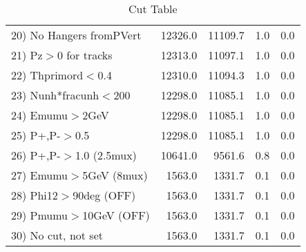 \begin{table}[h!]
\begin{tabular}{||l||r|r|r|r||}
 20) No Hangers fromPVert &     12326.0 &     11109.7 &         1.0 &         0.0 \\
 21) Pz$>$0 for tracks    &     12313.0 &     11097.1 &         1.0 &         0.0 \\
 22) Thprimord$<$0.4      &     12310.0 &     11094.3 &         1.0 &         0.0 \\
 23) Nunh*fracunh$<$200   &     12298.0 &     11085.1 &         1.0 &         0.0 \\
 24) Emumu$>$2GeV         &     12298.0 &     11085.1 &         1.0 &         0.0 \\
 25) P+,P-$>$0.5          &     12298.0 &     11085.1 &         1.0 &         0.0 \\
 26) P+,P-$>$1.0 (2.5mux) &     10641.0 &      9561.6 &         0.8 &         0.0 \\
 27) Emumu$>$5GeV  (8mux) &      1563.0 &      1331.7 &         0.1 &         0.0 \\
 28) Phi12$>$90deg  (OFF) &      1563.0 &      1331.7 &         0.1 &         0.0 \\
 29) Pmumu$>$10GeV  (OFF) &      1563.0 &      1331.7 &         0.1 &         0.0 \\
 30) No cut, not set      &      1563.0 &      1331.7 &         0.1 &         0.0 \\
 \hline
 \hline
 \end{tabular}
 \caption{Cut Table \cohjp  }
 \label{tab-cut__jpsi}
 \end{table}
